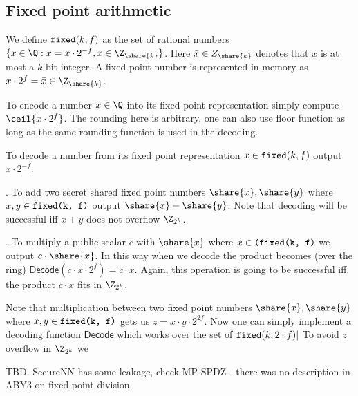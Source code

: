 \subsection{Fixed point arithmetic}
\label{subsec:fixed-point}

We define $\verb|fixed|(k, f)$ as the set of rational numbers $\{x \in
\Q : x = \bar{x} \cdot 2^{-f}, \bar{x} \in \Z_{\share{k}}\}$. Here $\bar{x}
\in Z_{\share{k}}$ denotes that $x$ is at most a $k$ bit integer. A fixed point number
is represented in memory as $x \cdot 2^{f} = \bar{x} \in \Z_{\share{k}}$.

 To encode a number $x \in \Q$ into its fixed
point representation simply compute $\ceil{x \cdot 2^f}$. The rounding here
is arbitrary, one can also use floor function as long as the same rounding
function is used in the decoding.

 To decode a number from its fixed point representation
$x \in \verb|fixed|(k, f)$ output $x \cdot 2^{-f}$.

. To add two secret shared fixed point numbers
$\share{x}, \share{y}$ where $x,y \in \verb|fixed(k, f)|$ output
$\share{x}+\share{y}$. Note that decoding will be successful iff $x+y$ does
not overflow $\Z_{2^k}$.

. To multiply a public scalar
$c$ with $\share{x}$ where $x \in \verb|(fixed(k, f)|$ we output
$c \cdot \share{x}$. In this way when we decode the product becomes (over the ring)
$\mathsf{Decode}(c \cdot x \cdot 2^f) = c \cdot x$. Again, this operation is going to
be successful iff. the product $c \cdot x$ fits in $\Z_{2^k}$.

 Note that multiplication between two
fixed point numbers $\share{x}, \share{y}$ where $x,y \in \verb|fixed(k, f)|$
gets us $z = x \cdot y \cdot 2^{2f}$. Now one can simply implement a decoding function
$\mathsf{Decode}$ which works over the set of $\verb|fixed|(k, 2\cdot f)|$
To avoid $z$ overflow in $\Z_{2^k}$ we



TBD. SecureNN has some leakage, check MP-SPDZ - there was no description in
ABY3 on fixed point division.

